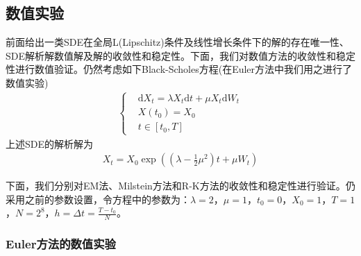     \subsection{数值实验}
        \label{subsec:数值实验}
        \par
        前面给出一类SDE在全局L(Lipschitz)条件及线性增长条件下的解的存在唯一性、SDE解析解数值解及解的收敛性和稳定性。下面，我们对数值方法的收敛性和稳定性进行数值验证。仍然考虑如下Black-Scholes方程(在Euler方法中我们用之进行了数值实验)
        \begin{align*}
            \left\{
            \begin{aligned}
            &\mathrm{d}X_t = \lambda X_t \mathrm{d}t + \mu X_t \mathrm{d}W_t\\
            &X(t_0) = X_0\\
            &t\in [t_0,T]
            \end{aligned}
            \right.
        \end{align*}
        上述SDE的解析解为
        \begin{align*}
            X_t = X_0\exp\left( \left( \lambda -\frac 12 \mu^2\right)t + \mu W_t \right)
        \end{align*}
        \par
        下面，我们分别对EM法、Milstein方法和R-K方法的收敛性和稳定性进行验证。仍采用之前的参数设置，令方程中的参数为：$\lambda = 2$，$\mu = 1$，$t_0 = 0$，$X_0 = 1$，$T = 1$，$N = 2^8$，$h = \Delta t = \frac{T - t_0}{N}$。
        \subsubsection{Euler方法的数值实验}
            \label{subsubsec:Euler方法的数值实验}

